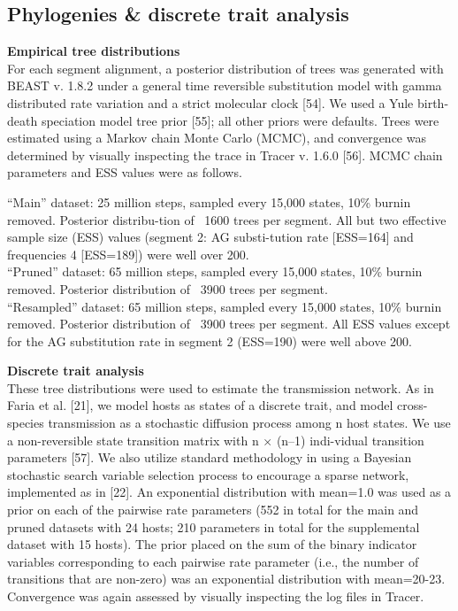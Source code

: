 \subsection*{Phylogenies & discrete trait analysis}
\textbf{Empirical tree distributions}\\
For each segment alignment, a posterior distribution of trees was generated with BEAST v. 1.8.2 under a general time reversible substitution model with gamma distributed rate variation and a strict molecular clock [54].
We used a Yule birth-death speciation model tree prior [55]; all other priors were defaults.
Trees were estimated using a Markov chain Monte Carlo (MCMC), and convergence was determined by visually inspecting the trace in Tracer v. 1.6.0 [56].
MCMC chain parameters and ESS values were as follows.

“Main” dataset: 25 million steps, sampled every 15,000 states, 10\% burnin removed. Posterior distribu-tion of ~1600 trees per segment. All but two effective sample size (ESS) values (segment 2: AG substi-tution rate [ESS=164] and frequencies 4 [ESS=189]) were well over 200. \\
“Pruned” dataset: 65 million steps, sampled every 15,000 states, 10\% burnin removed. Posterior distribution of ~3900 trees per segment. \\
“Resampled” dataset: 65 million steps, sampled every 15,000 states, 10\% burnin removed. Posterior distribution of ~3900 trees per segment. All ESS values except for the AG substitution rate in segment 2 (ESS=190) were well above 200.

\textbf{Discrete trait analysis}\\
These tree distributions were used to estimate the transmission network.
As in Faria et al. [21], we model hosts as states of a discrete trait, and model cross-species transmission as a stochastic diffusion process among n host states.
We use a non-reversible state transition matrix with n × (n–1) indi-vidual transition parameters [57].
We also utilize standard methodology in using a Bayesian stochastic search variable selection process to encourage a sparse network, implemented as in [22].
An exponential distribution with mean=1.0 was used as a prior on each of the pairwise rate parameters (552 in total for the main and pruned datasets with 24 hosts; 210 parameters in total for the supplemental dataset with 15 hosts).
The prior placed on the sum of the binary indicator variables corresponding to each pairwise rate parameter (i.e., the number of transitions that are non-zero) was an exponential distribution with mean=20-23.
Convergence was again assessed by visually inspecting the log files in Tracer.

